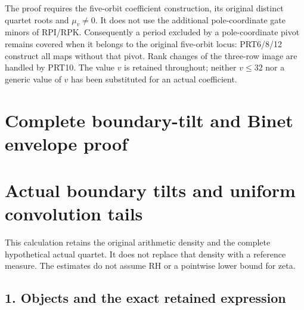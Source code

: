The proof requires the five-orbit coefficient construction, its original
distinct quartet roots and $\mu_v\ne0$. It does not use the additional
pole-coordinate gate minors of RPI/RPK. Consequently a period excluded
by a pole-coordinate pivot remains covered when it belongs to the
original five-orbit locus: PRT6/8/12 construct all maps without that
pivot. Rank changes of the three-row image are handled by PRT10.
The value $v$ is retained throughout; neither $v\le32$ nor a generic
value of $v$ has been substituted for an actual coefficient.

\label{prt:MPBUILD:PRT_CONNECTING_ENDPOINT_RETURN:end}
\endgroup

\clearpage
\begingroup


\setcounter{equation}{0}
\renewcommand{\theequation}{BT.\arabic{equation}}
\section*{Complete boundary-tilt and Binet envelope proof}
\section{Actual boundary tilts and uniform convolution tails}\label{bt:actual-boundary-tilts-and-uniform-convolution-tails}

This calculation retains the original arithmetic density and the complete hypothetical actual quartet. It does not replace that density with a reference measure. The estimates do not assume RH or a pointwise lower bound for zeta.

\subsection{1. Objects and the exact retained expression}\label{bt:objects-and-the-exact-retained-expression}

